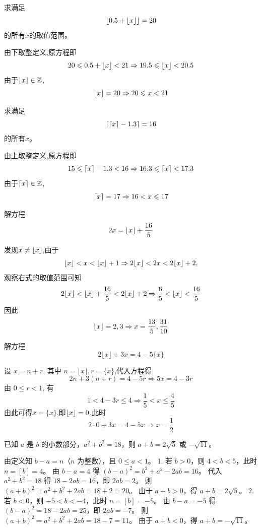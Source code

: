 \begin{questions}
    \question 求满足
    \[
    \lfloor0.5+\lfloor x\rfloor\rfloor = 20
    \]
    的所有$x$的取值范围。
    \begin{solution}
        由下取整定义,原方程即
        \[
        20 \leqslant 0.5+\lfloor x\rfloor< 21 \Rightarrow 19.5 \leqslant \lfloor x\rfloor < 20.5
        \]
        由于$\lfloor x\rfloor \in \mathbb{Z}$,
        \[
        \lfloor x\rfloor=20 \Rightarrow 20 \leqslant x < 21
        \]
    \end{solution}

    \question 求满足
    \[
    \lceil\lceil x\rceil-1.3\rceil = 16
    \]
    的所有$x$。
    \begin{solution}
        由上取整定义,原方程即
        \[
        15 \leqslant \lceil x\rceil -1.3 < 16 \Rightarrow 16.3 \leqslant \lceil x\rceil < 17.3
        \]
        由于$\lceil x\rceil \in \mathbb{Z}$,
        \[
        \lceil x\rceil=17 \Rightarrow 16 < x \leqslant 17
        \]
    \end{solution}

    \question 解方程 
    \[
    2x = \lfloor x\rfloor + \frac{16}{5}
    \]
    \begin{solution}
        发现$x\neq \lfloor x\rfloor$,由于 
        \[
        \lfloor x\rfloor < x < \lfloor x\rfloor + 1 \Rightarrow 2\lfloor x\rfloor < 2x < 2\lfloor x\rfloor + 2,
        \]
        观察右式的取值范围可知
        \[ 
        2\lfloor x\rfloor < \lfloor x\rfloor + \frac{16}{5} < 2\lfloor x\rfloor + 2 \Rightarrow \frac{6}{5} < \lfloor x\rfloor < \frac{16}{5} 
        \]
        因此 
        \[
        \lfloor x\rfloor = 2, 3 \Rightarrow x = \frac{13}{5}, \frac{31}{10}
        \]
    \end{solution}

    \question 解方程
    \[
    2\lfloor x \rfloor + 3x = 4 - 5\{x\}
    \]
    \begin{solution}
        设 $x = n+r$, 其中 $n = \lfloor x \rfloor,r = \{x\}$,代入方程得
        \[
        2n + 3(n+r) = 4 - 5r \Rightarrow 5x=4-3r
        \]
        由 $0 \le r < 1$, 有
        \[
        1 < 4-3r \le 4 \Rightarrow \frac{1}{5} < x \le \frac{4}{5}
        \]
        由此可得$x=\{x\}$,即$\lfloor x\rfloor=0$,此时
        \[
        2\cdot 0 +3x=4-5x \Rightarrow x=\frac{1}{2}
        \]
    \end{solution}

    \question 已知 $a$ 是 $b$ 的小数部分，$a^2 + b^2 = 18$，则 $a+b = 2\sqrt{5}$ 或 $-\sqrt{11}$。

\begin{solution}
由定义知 $b-a = n$（$n$ 为整数），且 $0 \le a < 1$。
1. 若 $b > 0$，则 $4 < b < 5$，此时 $n = [b] = 4$。
由 $b-a = 4$ 得 $(b-a)^2 = b^2 + a^2 - 2ab = 16$。
代入 $a^2+b^2=18$ 得 $18 - 2ab = 16$，即 $2ab = 2$。
则 $(a+b)^2 = a^2 + b^2 + 2ab = 18 + 2 = 20$。
由于 $a+b > 0$，得 $a+b = 2\sqrt{5}$。
2. 若 $b < 0$，则 $-5 < b < -4$，此时 $n = [b] = -5$。
由 $b-a = -5$ 得 $(b-a)^2 = 18 - 2ab = 25$，即 $2ab = -7$。
则 $(a+b)^2 = a^2 + b^2 + 2ab = 18 - 7 = 11$。
由于 $a+b < 0$，得 $a+b = -\sqrt{11}$。
\end{solution}


\end{questions}
